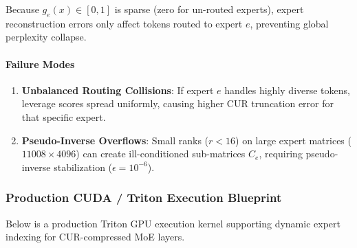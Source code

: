Because $g_e(x) \in [0, 1]$ is sparse (zero for un-routed experts), expert reconstruction errors only affect tokens routed to expert $e$, preventing global perplexity collapse.

\paragraph{Failure Modes}
\begin{enumerate}
\item \textbf{Unbalanced Routing Collisions}: If expert $e$ handles highly diverse tokens, leverage scores spread uniformly, causing higher CUR truncation error for that specific expert.
\item \textbf{Pseudo-Inverse Overflows}: Small ranks ($r < 16$) on large expert matrices ($11008 \times 4096$) can create ill-conditioned sub-matrices $C_e$, requiring pseudo-inverse stabilization ($\epsilon = 10^{-6}$).


\end{enumerate}
\subsubsection*{Production CUDA / Triton Execution Blueprint}

Below is a production Triton GPU execution kernel supporting dynamic expert indexing for CUR-compressed MoE layers.


